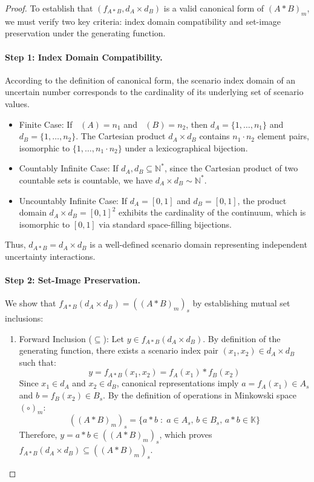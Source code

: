 \documentclass[a4paper,12pt, twoside]{memoir}
\DeclareMathOperator{\dimU}{\dim_U}
\newcommand{\kgdt}[1]{\left(#1\right)_m} %
\begin{document}
\begin{proof}
	To establish that $(f_{A*B}, d_A \times d_B)$ is a valid canonical form of $\kgdt{A * B}$, we must verify two key criteria: index domain compatibility and set-image preservation under the generating function.

	\paragraph{Step 1: Index Domain Compatibility.}
	According to the definition of canonical form, the scenario index domain of an uncertain number corresponds to the cardinality of its underlying set of scenario values.
	\begin{itemize}[leftmargin=*]
		\item Finite Case: If $\dimU(A) = n_1$ and $\dimU(B) = n_2$, then $d_A = \{1, \dots, n_1\}$ and $d_B = \{1, \dots, n_2\}$. The Cartesian product $d_A \times d_B$ contains $n_1 \cdot n_2$ element pairs, isomorphic to $\{1, \dots, n_1 \cdot n_2\}$ under a lexicographical bijection.
		\item Countably Infinite Case: If $d_A, d_B \subseteq \mathbb{N}^*$, since the Cartesian product of two countable sets is countable, we have $d_A \times d_B \sim \mathbb{N}^*$.
		\item Uncountably Infinite Case: If $d_A = [0, 1]$ and $d_B = [0, 1]$, the product domain $d_A \times d_B = [0, 1]^2$ exhibits the cardinality of the continuum, which is isomorphic to $[0, 1]$ via standard space-filling bijections.
	\end{itemize}
	Thus, $d_{A*B} = d_A \times d_B$ is a well-defined scenario domain representing independent uncertainty interactions.

	\paragraph{Step 2: Set-Image Preservation.}
	We show that $f_{A*B}(d_A \times d_B) = (\kgdt{A * B})_s$ by establishing mutual set inclusions:

	\begin{enumerate}[leftmargin=*]
		\item Forward Inclusion ($\subseteq$):
		      Let $y \in f_{A*B}(d_A \times d_B)$. By definition of the generating function, there exists a scenario index pair $(x_1, x_2) \in d_A \times d_B$ such that:
		      \[
			      y = f_{A*B}(x_1, x_2) = f_A(x_1) * f_B(x_2)
		      \]
		      Since $x_1 \in d_A$ and $x_2 \in d_B$, canonical representations imply $a = f_A(x_1) \in A_s$ and $b = f_B(x_2) \in B_s$. By the definition of operations in Minkowski space $(\circ)_m$:
		      \[
			      (\kgdt{A * B})_s = \{a * b \;:\; a \in A_s, \, b \in B_s, \, a * b \in \mathbb{K}\}
		      \]
		      Therefore, $y = a * b \in (\kgdt{A * B})_s$, which proves $f_{A*B}(d_A \times d_B) \subseteq (\kgdt{A * B})_s$.


\end{enumerate}
\end{proof}
\end{document}

